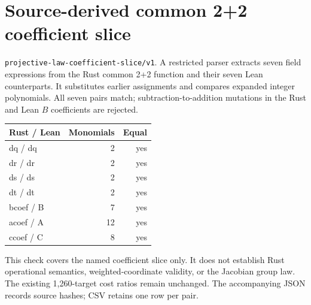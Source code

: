 \documentclass[11pt]{article}
\begin{document}
\section*{Source-derived common 2+2 coefficient slice}
\texttt{projective-law-coefficient-slice/v1}. A restricted parser extracts
seven field expressions from the Rust common 2+2 function and their seven
Lean counterparts. It substitutes earlier assignments and compares expanded
integer polynomials. All seven pairs match; subtraction-to-addition
mutations in the Rust and Lean $B$ coefficients are rejected.

\begin{center}
\begin{tabular}{lrr}
\toprule
Rust / Lean & Monomials & Equal\\
\midrule
dq / dq & 2 & yes\\
dr / dr & 2 & yes\\
ds / ds & 2 & yes\\
dt / dt & 2 & yes\\
bcoef / B & 7 & yes\\
acoef / A & 12 & yes\\
ccoef / C & 8 & yes\\
\bottomrule
\end{tabular}
\end{center}
\noindent This check covers the named coefficient slice only. It does not
establish Rust operational semantics, weighted-coordinate validity, or the
Jacobian group law. The existing 1,260-target cost ratios remain unchanged.
The accompanying JSON records source hashes; CSV retains one row per pair.
\end{document}

